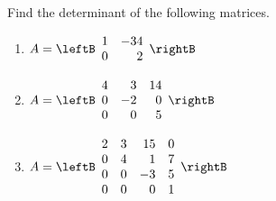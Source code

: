 \begin{enumialphparenastyle}

\begin{ex} Find the determinant of the following matrices.

\begin{enumerate}
\item 
$A = \leftB \begin{array}{rr}
1 & -34 \\
0 & 2 
\end{array} \rightB $

\item 
$A = \leftB \begin{array}{rrr}
4 & 3 & 14 \\
 0 & -2 & 0 \\
0 & 0 & 5 
\end{array} \rightB$

\item 
$A = \leftB \begin{array}{rrrr}
2 & 3 & 15 & 0 \\
0 & 4 & 1 & 7 \\
0 & 0 & -3 & 5 \\
0 & 0 & 0 & 1 
\end{array} \rightB$
\end{enumerate}


\end{ex}

\end{enumialphparenastyle}